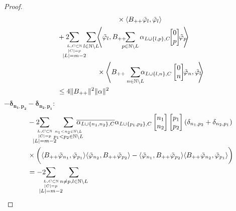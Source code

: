 \documentclass[b5paper,draft,openbib,12pt]{memoir}
\begin{document}
\begin{proof}
\begin{align}
  &\hspace{3cm}\times \langle B_{++} \tilde{\varphi}_l,\tilde{\varphi}_l \rangle\\
  &+2\hspace{-0.4cm}\sum_{\overset{L,C\subset \mathbb{N}}{\overset{|C|=p}{|L|=m-2}}}\hspace{-0.2cm}\sum_{l \in\mathbb{N}\backslash L }
\!\!\!\left\langle \tilde{\varphi}_{l} ,B_{++}\!\!\!\!\!\sum_{p\in\mathbb{N}\backslash L}\alpha_{L\cup \{l,p\},C}\!\!\left[\begin{matrix}0\\p\end{matrix}\right]\!\! \tilde{\varphi}_{p}  \!\!\!\right\rangle\\
&\hspace{2cm}\times \left\langle B_{++}\sum_{n\in\mathbb{N}\backslash L}\!\!\!\!\alpha_{L\cup \{l,n\},C}\left[\begin{matrix}0\\n\end{matrix}\right] \!\!\tilde{\varphi}_{n} , \tilde{\varphi}_{l}  \!\!\!\right\rangle\\
  &\le 4 \|B_{++}\|^2 \|\alpha\|^2
\end{align}
\(\boldsymbol{-\delta_{n_1,p_2}-\delta_{n_2,p_1}:}\)
\begin{align}
&-2\hspace{-0.4cm}\sum_{\overset{L,C\subset \mathbb{N}}{\overset{|C|=p}{|L|=m-2}}}\hspace{-0.2cm}\sum_{\overset{n_1<n_2\in\mathbb{N}\backslash L }{p_1<p_2\in\mathbb{N}\backslash L }}
\hspace{-0.4cm}\overline{\alpha_{L\cup\{n_1,n_2\},C}}\alpha_{L\cup\{p_1,p_2\},C}
\left[\begin{matrix}n_1\\n_2\end{matrix}\right]\left[\begin{matrix}p_1\\p_2\end{matrix}\right](\delta_{n_1,p_2}+\delta_{n_2,p_1})\\
&\times \bigg(
\langle B_{++}\tilde{\varphi}_{n_1},\tilde{\varphi}_{p_1} \rangle \langle  \tilde{\varphi}_{n_2}, B_{++}\tilde{\varphi}_{p_2}\rangle
-\langle \tilde{\varphi}_{n_1},B_{++}\tilde{\varphi}_{p_2} \rangle \langle B_{++} \tilde{\varphi}_{n_2}, \tilde{\varphi}_{p_1}\rangle\bigg)\\
&=-2\hspace{-0.4cm}\sum_{\overset{L,C\subset \mathbb{N}}{\overset{|C|=p}{|L|=m-2}}}\hspace{-0.2cm}\sum_{n\neq p,l\in\mathbb{N}\backslash L }

\end{align}
\end{proof}
\end{document}
